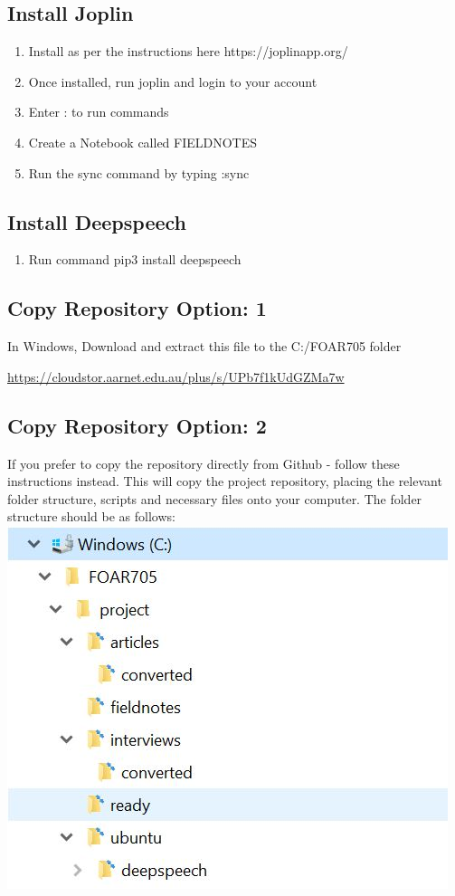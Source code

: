\documentclass{article}
\begin{document}
\subsection{Install Joplin}
\begin{enumerate}
    \item Install as per the instructions here https://joplinapp.org/
    \item Once installed, run joplin and login to your account
    \item Enter : to run commands
    \item Create a Notebook called FIELDNOTES
    \item Run the sync command by typing :sync
\end{enumerate}

\subsection{Install Deepspeech}
\begin{enumerate}
    \item Run command pip3 install deepspeech
\end{enumerate}


\subsection{Copy Repository Option: 1}
In Windows, Download and extract this file to the C:/FOAR705 folder

\url{https://cloudstor.aarnet.edu.au/plus/s/UPb7f1kUdGZMa7w}


\subsection{Copy Repository Option: 2}
If you prefer to copy the repository directly from Github - follow these instructions instead. This will copy the project repository, placing the relevant folder structure, scripts and necessary files onto your computer.
\vspace{0.5cm}
The folder structure should be as follows:\\
\vspace{0.5cm}
\includegraphics{folderstructure.JPG}
\end{document}
